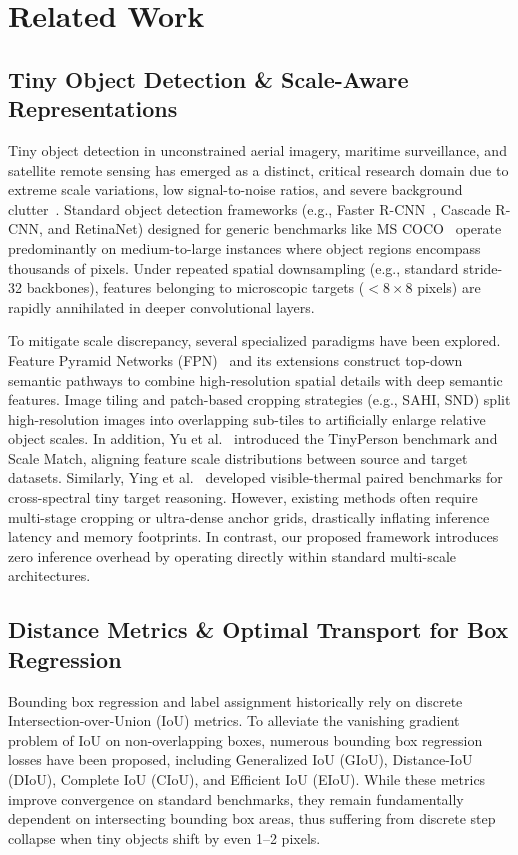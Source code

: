 \section{Related Work}
\label{sec:related_work}

\subsection{Tiny Object Detection \& Scale-Aware Representations}
Tiny object detection in unconstrained aerial imagery, maritime surveillance, and satellite remote sensing has emerged as a distinct, critical research domain due to extreme scale variations, low signal-to-noise ratios, and severe background clutter~\cite{yu2020tinyperson,ying2025safit,lin2017fpn}. Standard object detection frameworks (e.g., Faster R-CNN~\cite{ren2015faster}, Cascade R-CNN, and RetinaNet) designed for generic benchmarks like MS COCO~\cite{lin2014coco} operate predominantly on medium-to-large instances where object regions encompass thousands of pixels. Under repeated spatial downsampling (e.g., standard stride-32 backbones), features belonging to microscopic targets ($<8\times 8$ pixels) are rapidly annihilated in deeper convolutional layers.

To mitigate scale discrepancy, several specialized paradigms have been explored. Feature Pyramid Networks (FPN)~\cite{lin2017fpn} and its extensions construct top-down semantic pathways to combine high-resolution spatial details with deep semantic features. Image tiling and patch-based cropping strategies (e.g., SAHI, SND) split high-resolution images into overlapping sub-tiles to artificially enlarge relative object scales. In addition, Yu et al.~\cite{yu2020tinyperson} introduced the TinyPerson benchmark and Scale Match, aligning feature scale distributions between source and target datasets. Similarly, Ying et al.~\cite{ying2025safit} developed visible-thermal paired benchmarks for cross-spectral tiny target reasoning. However, existing methods often require multi-stage cropping or ultra-dense anchor grids, drastically inflating inference latency and memory footprints. In contrast, our proposed framework introduces zero inference overhead by operating directly within standard multi-scale architectures.

\subsection{Distance Metrics \& Optimal Transport for Box Regression}
Bounding box regression and label assignment historically rely on discrete Intersection-over-Union (IoU) metrics. To alleviate the vanishing gradient problem of IoU on non-overlapping boxes, numerous bounding box regression losses have been proposed, including Generalized IoU (GIoU), Distance-IoU (DIoU), Complete IoU (CIoU), and Efficient IoU (EIoU). While these metrics improve convergence on standard benchmarks, they remain fundamentally dependent on intersecting bounding box areas, thus suffering from discrete step collapse when tiny objects shift by even 1--2 pixels.

